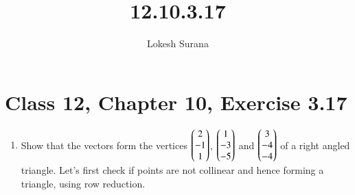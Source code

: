 \documentclass[journal,12pt,twocolumn]{IEEEtran}
\begin{document}
\vspace{3cm}
\title{12.10.3.17}
\author{Lokesh Surana}
\maketitle
\section*{Class 12, Chapter 10, Exercise 3.17}
\begin{enumerate}[start=17]
\item  Show that the vectors form the vertices $\begin{pmatrix}2\\-1\\1\end{pmatrix}$, $\begin{pmatrix}1\\-3\\-5\end{pmatrix}$ and $\begin{pmatrix}3\\-4\\-4\end{pmatrix}$ of a right angled triangle.
\break
\solution Let's first check if points are not collinear and hence forming a triangle, using row reduction.


\end{enumerate}
\end{document}

